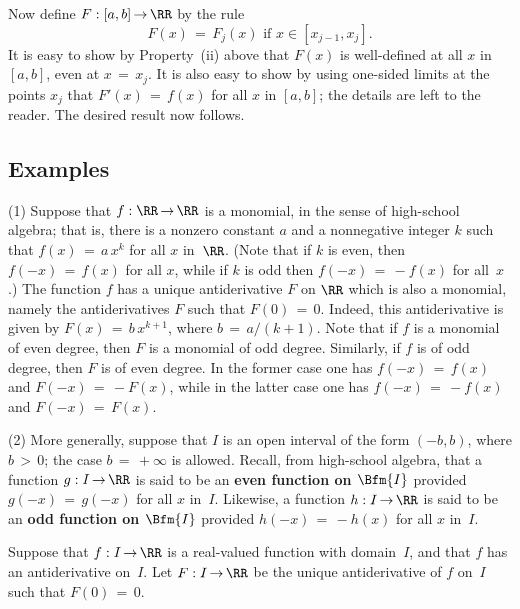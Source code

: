 {\noindent Now define $F:[a,b] \,{\rightarrow}\, {\RR}$ by the rule
        \begin{displaymath}
        F(x) \,=\, F_{j}(x) \mbox{ if $x{\in}[x_{j-1},x_{j}]$}.
        \end{displaymath}
    It is easy to show by Property~(ii) above that $F(x)$ is well-defined at all $x$ in $[a,b]$, even at $x \,=\, x_{j}$.
    It is also easy to show by using one-sided limits at the points $x_{j}$ that $F'(x) \,=\, f(x)$ for all $x$ in $[a,b]$; the details are left to the reader.
    The desired result now follows. \Q

\VV

             \subsection{\small{\bf Examples}}
            \label{ExampE45.65}
\V

\hspace*{\parindent}(1) Suppose that $f:{\RR} \,{\rightarrow}\, {\RR}$ is a monomial, in the sense of high-school algebra;
    that is, there is a nonzero constant $a$ and a nonnegative integer $k$ such that $f(x) \,=\, a\,x^{k}$ for all $x$ in~${\RR}$.
    (Note that if $k$ is even, then $f(-x) \,=\, f(x)$ for all $x$, while if $k$ is odd then $f(-x) \,=\, -f(x)$ for all~$x$.)
    The function $f$ has a unique antiderivative $F$ on ${\RR}$ which is also a monomial, namely the antiderivatives $F$ such that $F(0) \,=\, 0$.
    Indeed, this antiderivative is given by $F(x) \,=\, b\,x^{k+1}$, where $b \,=\, a/(k+1)$.
    Note that if $f$ is a monomial of even degree, then $F$ is a monomial of odd  degree. Similarly, if $f$ is of odd degree, then $F$ is of even degree.
   In the former case one has $f(-x) \,=\, f(x)$ and $F(-x) \,=\, -F(x)$, while in the latter case one has $f(-x) \,=\, -f(x)$ and $F(-x) \,=\, F(x)$.

\V

        (2) More generally, suppose that $I$ is an open interval of the form $(-b,b)$, where $b\,>\,0$; the case $b \,=\, +{\infty}$ is allowed.
    Recall, from high-school algebra, that a function $g:I \,{\rightarrow}\, {\RR}$ is said to be an
    {\bf even function on $\Bfm{I}$} provided $g(-x) \,=\, g(-x)$ for all $x$ in~$I$.
    Likewise, a function $h:I \,{\rightarrow}\, {\RR}$ is said to be an {\bf odd function on $\Bfm{I}$} provided $h(-x) \,=\, -h(x)$ for all $x$ in~$I$.

        Suppose that $f:I \,{\rightarrow}\, {\RR}$ is a real-valued function with domain~$I$, and that $f$ has an antiderivative on~$I$.
    Let $F:I \,{\rightarrow}\, {\RR}$ be the unique antiderivative of $f$ on~$I$ such that $F(0) \,=\, 0$.

}
